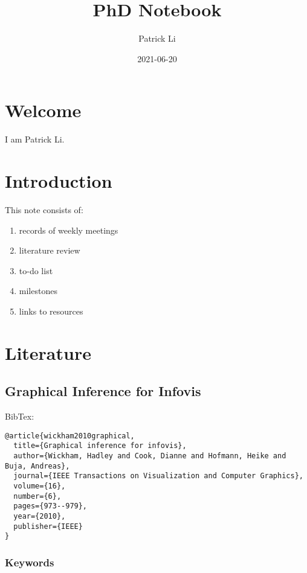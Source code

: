 \documentclass[
]{book}
\title{PhD Notebook}
\author{Patrick Li}
\date{2021-06-20}
\providecommand{\tightlist}{%
  \setlength{\itemsep}{0pt}\setlength{\parskip}{0pt}}
\begin{document}
\maketitle

{
\setcounter{tocdepth}{1}
\tableofcontents
}
\hypertarget{welcome}{%
\chapter{Welcome}\label{welcome}}

I am Patrick Li.

\hypertarget{introduction}{%
\chapter{Introduction}\label{introduction}}

This note consists of:

\begin{enumerate}
\def\labelenumi{\arabic{enumi}.}
\tightlist
\item
  records of weekly meetings
\item
  literature review
\item
  to-do list
\item
  milestones
\item
  links to resources
\end{enumerate}

\hypertarget{literature}{%
\chapter{Literature}\label{literature}}

\hypertarget{graphical-inference-for-infovis}{%
\section{Graphical Inference for Infovis}\label{graphical-inference-for-infovis}}

BibTex:

\begin{verbatim}
@article{wickham2010graphical,
  title={Graphical inference for infovis},
  author={Wickham, Hadley and Cook, Dianne and Hofmann, Heike and Buja, Andreas},
  journal={IEEE Transactions on Visualization and Computer Graphics},
  volume={16},
  number={6},
  pages={973--979},
  year={2010},
  publisher={IEEE}
}
\end{verbatim}

\hypertarget{keywords}{%
\subsection{Keywords}\label{keywords}}
\end{document}
